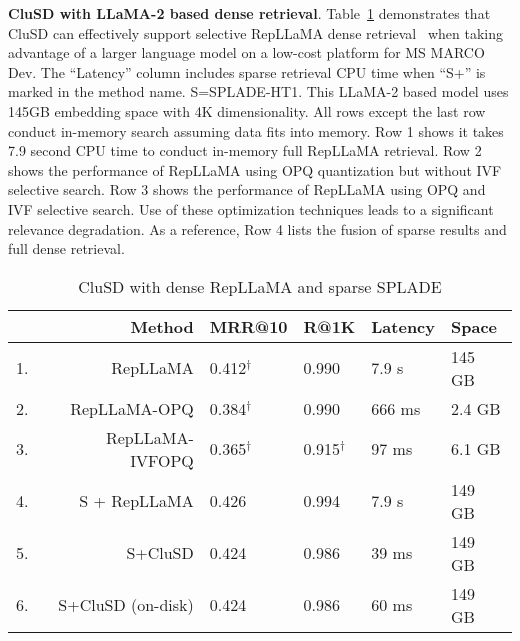 {\bf CluSD with LLaMA-2 based dense retrieval}.
Table~\ref{tab:RepLLaMA}
demonstrates that CluSD can effectively support selective RepLLaMA dense retrieval~\cite{ma2023finetuning} 
 when taking advantage of  a larger language model  on a low-cost platform for MS MARCO Dev. 
The ``Latency'' column includes sparse retrieval CPU time when ``S+'' is marked in the method name. 
S=SPLADE-HT1.
This LLaMA-2 based model uses 145GB embedding space with 4K dimensionality.
All rows except the last row  conduct in-memory search assuming data fits into memory.
Row 1 shows  it takes 7.9 second CPU time to conduct in-memory full RepLLaMA  retrieval. 
Row 2  shows the performance of RepLLaMA using OPQ quantization but without IVF selective search.
Row 3  shows the performance of RepLLaMA using OPQ and  IVF selective search.
Use  of these optimization techniques leads to  a significant relevance degradation. 
As a reference, Row 4 lists the fusion of sparse results and  full dense retrieval. 






\begin{table}[htbp]
\vspace*{-1em}
\small
        \centering
                \begin{tabular}{r r |l l|l l}
                        \hline\hline 
     &Method    & MRR@10 & R@1K & Latency & Space \\
                        \hline
1.  & RepLLaMA     & 0.412$^\dag$& 	0.990& 	7.9 s& 	145 GB\\
2.   &RepLLaMA-OPQ& 	0.384$^\dag$& 	0.990& 	666 ms& 	2.4 GB \\
3.  & RepLLaMA-IVFOPQ & 	0.365$^\dag$ & 	0.915$^\dag$ & 	97 ms & 	6.1 GB\\
4.   & S + RepLLaMA  & 	0.426& 	0.994& 	7.9 s& 	149 GB\\
5.   & S+CluSD & 0.424	& 0.986& 	39 ms& 	149 GB\\
6.   & S+CluSD (on-disk)& 	0.424	& 0.986& 	60 ms& 	149 GB\\
                \hline\hline
                \end{tabular}  
        \caption{CluSD with  dense RepLLaMA and  sparse SPLADE} 
\vspace*{-2em}
        \label{tab:RepLLaMA}
\end{table}


